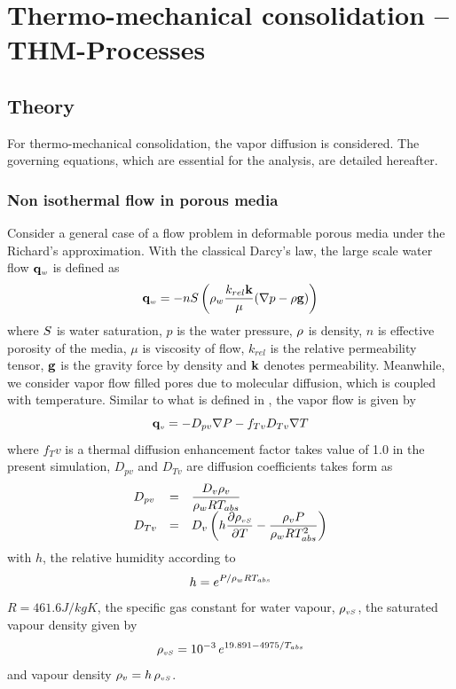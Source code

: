 \chapter{Thermo-mechanical consolidation -- THM-Processes}
\label{sec:thm}

\section{Theory}
For thermo-mechanical consolidation, the vapor diffusion is considered.  The governing equations, which are
essential for the analysis, are detailed hereafter.
\subsection{Non isothermal flow in porous media}
Consider a general case of a flow problem in deformable porous media
under the Richard's approximation. With the classical Darcy's law,
the large scale water flow $\mathbf{q}_{\scriptscriptstyle w}$ is defined as
\begin{equation}
\mathbf{q}_{\scriptscriptstyle w} = -n S\left(\rho_w \dfrac{k_{rel}\mathbf k}{\mu}(\nabla
p-\rho\mathbf g)\right)
 \label{eq:fflux}
\end{equation}
where $S$ is water saturation, $p$ is the water pressure,
$\rho$ is density, $n$ is effective porosity of the media, $\mu$ is
viscosity of flow, $k_{rel}$ is the relative permeability tensor,
$\mathbf g$ is the gravity force by density  and $\mathbf k$ denotes
permeability. Meanwhile, we consider vapor flow  filled pores due to
molecular diffusion, which is coupled with temperature. Similar to
what is defined in \cite{Jonny05}, the vapor flow is given by
\begin{equation}
\mathbf{q}_{\scriptscriptstyle v} = -D_{pv}\nabla P-f_{Tv}D_{Tv}\nabla T
 \label{eq:fluxv}
\end{equation}
where ${f_Tv}$ is a thermal diffusion enhancement factor takes value
of 1.0 in the present simulation, $D_{pv}$ and $D_{Tv}$ are
diffusion coefficients takes form as
\begin{equation}
\begin{array}{lcl}
D_{pv}&=& \dfrac{D_v\rho_v}{\rho_wRT_{abs}}\\
D_{Tv}&=& D_v\left(h\dfrac{\partial \rho_{\scriptscriptstyle vS}}{\partial T}-\dfrac{\rho_v P}{\rho_w R T^2_{abs}}\right)\\
\end{array}
 \label{eq:diffus}
\end{equation}
with $h$, the relative humidity according to
\begin{equation}
h=e^{P/\rho_w R T_{abs}}
 \label{eq:hum}
\end{equation}
 $R=461.6J/kgK$, the specific gas constant for water vapour,
$\rho_{\scriptscriptstyle vS}$, the saturated vapour density given
by
\begin{equation}
\rho_{\scriptscriptstyle  vS}=10^{-3}\, e^{19.891-4975/T_{abs}}
 \label{eq:vap}
\end{equation}
and vapour density $\rho_v = h\, \rho_{\scriptscriptstyle vS}$.

